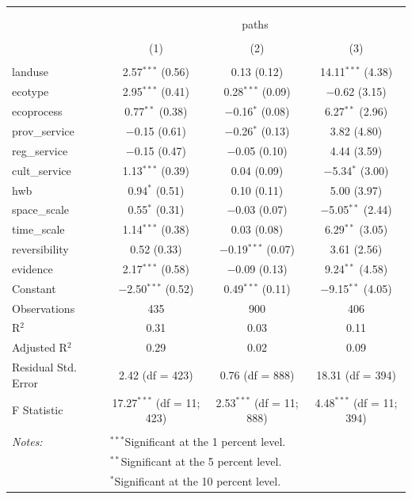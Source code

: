 \documentclass[9pt,]{article}
\begin{document}
\begin{tabular}{@{\extracolsep{5pt}}lccc} 
\\[-1.8ex]\hline 
\hline \\[-1.8ex] 
\\[-1.8ex] & \multicolumn{3}{c}{paths} \\ 
\\[-1.8ex] & (1) & (2) & (3)\\ 
\hline \\[-1.8ex] 
 landuse & 2.57$^{***}$ (0.56) & 0.13 (0.12) & 14.11$^{***}$ (4.38) \\ 
  ecotype & 2.95$^{***}$ (0.41) & 0.28$^{***}$ (0.09) & $-$0.62 (3.15) \\ 
  ecoprocess & 0.77$^{**}$ (0.38) & $-$0.16$^{*}$ (0.08) & 6.27$^{**}$ (2.96) \\ 
  prov\_service & $-$0.15 (0.61) & $-$0.26$^{*}$ (0.13) & 3.82 (4.80) \\ 
  reg\_service & $-$0.15 (0.47) & $-$0.05 (0.10) & 4.44 (3.59) \\ 
  cult\_service & 1.13$^{***}$ (0.39) & 0.04 (0.09) & $-$5.34$^{*}$ (3.00) \\ 
  hwb & 0.94$^{*}$ (0.51) & 0.10 (0.11) & 5.00 (3.97) \\ 
  space\_scale & 0.55$^{*}$ (0.31) & $-$0.03 (0.07) & $-$5.05$^{**}$ (2.44) \\ 
  time\_scale & 1.14$^{***}$ (0.38) & 0.03 (0.08) & 6.29$^{**}$ (3.05) \\ 
  reversibility & 0.52 (0.33) & $-$0.19$^{***}$ (0.07) & 3.61 (2.56) \\ 
  evidence & 2.17$^{***}$ (0.58) & $-$0.09 (0.13) & 9.24$^{**}$ (4.58) \\ 
  Constant & $-$2.50$^{***}$ (0.52) & 0.49$^{***}$ (0.11) & $-$9.15$^{**}$ (4.05) \\ 
 Observations & 435 & 900 & 406 \\ 
R$^{2}$ & 0.31 & 0.03 & 0.11 \\ 
Adjusted R$^{2}$ & 0.29 & 0.02 & 0.09 \\ 
Residual Std. Error & 2.42 (df = 423) & 0.76 (df = 888) & 18.31 (df = 394) \\ 
F Statistic & 17.27$^{***}$ (df = 11; 423) & 2.53$^{***}$ (df = 11; 888) & 4.48$^{***}$ (df = 11; 394) \\ 
\hline \\[-1.8ex] 
\textit{Notes:} & \multicolumn{3}{l}{$^{***}$Significant at the 1 percent level.} \\ 
 & \multicolumn{3}{l}{$^{**}$Significant at the 5 percent level.} \\ 
 & \multicolumn{3}{l}{$^{*}$Significant at the 10 percent level.} \\ 
\end{tabular}
\end{document}
